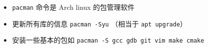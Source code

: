 
\begin{issues}
\issueDraft
\end{issues}

\begin{itemize}
\item \verb|pacman| 命令是 Arch linux 的包管理软件
\item 更新所有库的信息 \verb|pacman -Syu| （相当于 \verb|apt upgrade|）
\item 安装一些基本的包如 \verb|pacman -S gcc gdb git vim make cmake|
\end{itemize}
